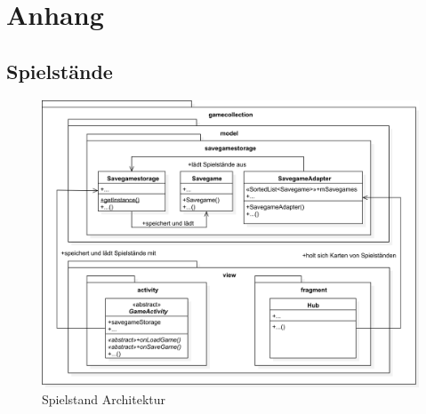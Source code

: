 \chapter{Anhang}

\section{Spielstände}
\sectionauthor{\leonard}

\begin{figure}[h]
	\centering
	\includegraphics[width=1.0\textwidth]{resources/savegamestorage/Savegamestorage}
	\caption{Spielstand Architektur}
\end{figure}